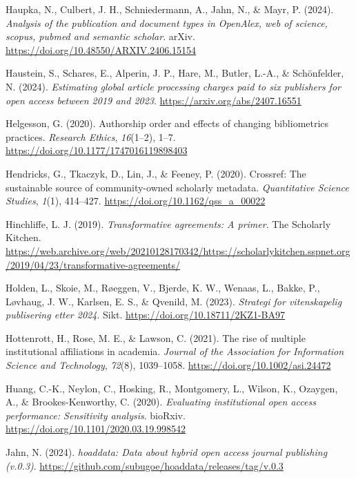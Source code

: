 \documentclass[a4paper,man,floatsintext,longtable,noextraspace,10pt]{apa6}
\newlength{\cslhangindent}
\newenvironment{CSLReferences}[2] %
{\begin{list}{}{%
  \setlength{\itemindent}{0pt}
  \setlength{\leftmargin}{0pt}
  \setlength{\parsep}{0pt}
  \ifodd #1
  \setlength{\leftmargin}{\cslhangindent}
  \setlength{\itemindent}{-1\cslhangindent}
  \fi
  \setlength{\itemsep}{#2\baselineskip}}}
{\end{list}}
\begin{document}
\begin{CSLReferences}{1}{0}
Haupka, N., Culbert, J. H., Schniedermann, A., Jahn, N., \& Mayr, P.
(2024). \emph{Analysis of the publication and document types in
OpenAlex, web of science, scopus, pubmed and semantic scholar}. arXiv.
\url{https://doi.org/10.48550/ARXIV.2406.15154}

Haustein, S., Schares, E., Alperin, J. P., Hare, M., Butler, L.-A., \&
Schönfelder, N. (2024). \emph{Estimating global article processing
charges paid to six publishers for open access between 2019 and 2023}.
\url{https://arxiv.org/abs/2407.16551}

Helgesson, G. (2020). Authorship order and effects of changing
bibliometrics practices. \emph{Research Ethics}, \emph{16}(1--2), 1--7.
\url{https://doi.org/10.1177/1747016119898403}

Hendricks, G., Tkaczyk, D., Lin, J., \& Feeney, P. (2020). Crossref: The
sustainable source of community-owned scholarly metadata.
\emph{Quantitative Science Studies}, \emph{1}(1), 414--427.
\url{https://doi.org/10.1162/qss_a_00022}

Hinchliffe, L. J. (2019). \emph{Transformative agreements: A primer}.
The Scholarly Kitchen.
\url{https://web.archive.org/web/20210128170342/https://scholarlykitchen.sspnet.org/2019/04/23/transformative-agreements/}

Holden, L., Skoie, M., Røeggen, V., Bjerde, K. W., Wenaas, L., Bakke,
P., Løvhaug, J. W., Karlsen, E. S., \& Qvenild, M. (2023).
\emph{Strategi for vitenskapelig publisering etter 2024}. Sikt.
\url{https://doi.org/10.18711/2KZ1-BA97}

Hottenrott, H., Rose, M. E., \& Lawson, C. (2021). The rise of multiple
institutional affiliations in academia. \emph{Journal of the Association
for Information Science and Technology}, \emph{72}(8), 1039--1058.
\url{https://doi.org/10.1002/asi.24472}

Huang, C.-K., Neylon, C., Hosking, R., Montgomery, L., Wilson, K.,
Ozaygen, A., \& Brookes-Kenworthy, C. (2020). \emph{Evaluating
institutional open access performance: Sensitivity analysis}. bioRxiv.
\url{https://doi.org/10.1101/2020.03.19.998542}

Jahn, N. (2024). \emph{{hoaddata}: Data about hybrid open access journal
publishing (v.0.3)}.
\url{https://github.com/subugoe/hoaddata/releases/tag/v.0.3}


\end{CSLReferences}
\end{document}
